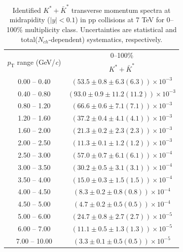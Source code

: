 \clearpage
\begin{table}
\caption{Identified $K^{*} + \bar{K}^{*}$ transverse momentum spectra at midrapidity ($|y|<0.1$) in pp collisions at 7 TeV for 0--100\% multiplicity class. Uncertainties are statistical and total($N_{ch}$-dependent) systematics, respectively.}
\label{tab:KStar_0to100}
\begin{center}
\begin{tabular}{ c | c }
\hline
\multirow{2}{*}{$p_{\mathrm{T}}$ range (GeV/\textit{c})} & \multicolumn{1}{c}{0--100\%} \\ & $K^{*} + \bar{K}^{*}$\\ 
\hline
0.00 -- 0.40 & $(53.5\pm0.8\pm6.3(6.3))\times10^{-3}$ \\ 
0.40 -- 0.80 & $(93.0\pm0.9\pm11.2(11.2))\times10^{-3}$ \\ 
0.80 -- 1.20 & $(66.6\pm0.6\pm7.1(7.1))\times10^{-3}$ \\ 
1.20 -- 1.60 & $(37.2\pm0.4\pm4.1(4.1))\times10^{-3}$ \\ 
1.60 -- 2.00 & $(21.3\pm0.2\pm2.3(2.3))\times10^{-3}$ \\ 
2.00 -- 2.50 & $(11.3\pm0.1\pm1.2(1.2))\times10^{-3}$ \\ 
2.50 -- 3.00 & $(57.0\pm0.7\pm6.1(6.1))\times10^{-4}$ \\ 
3.00 -- 3.50 & $(30.2\pm0.5\pm3.1(3.1))\times10^{-4}$ \\ 
3.50 -- 4.00 & $(15.0\pm0.3\pm1.5(1.5))\times10^{-4}$ \\ 
4.00 -- 4.50 & $(8.3\pm0.2\pm0.8(0.8))\times10^{-4}$ \\ 
4.50 -- 5.00 & $(4.7\pm0.2\pm0.5(0.5))\times10^{-4}$ \\ 
5.00 -- 6.00 & $(24.7\pm0.8\pm2.7(2.7))\times10^{-5}$ \\ 
6.00 -- 7.00 & $(11.1\pm0.5\pm1.3(1.3))\times10^{-5}$ \\ 
7.00 -- 10.00 & $(3.3\pm0.1\pm0.5(0.5))\times10^{-5}$ \\ 
\hline
\end{tabular}
\end{center}
\end{table}
 
